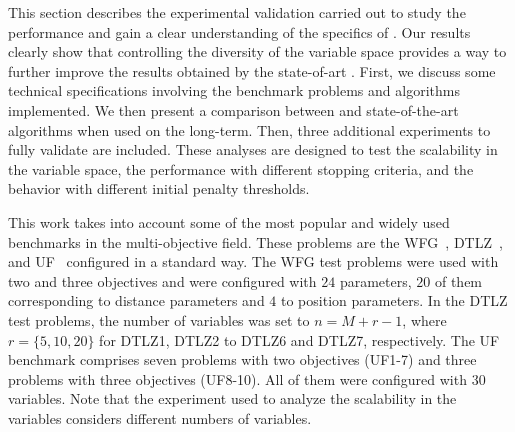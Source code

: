 This section describes the experimental validation carried out to study the performance and
gain a clear understanding of the specifics of \VSDMOEA{}.
%
Our results clearly show that controlling the diversity of the variable space provides a way to further improve the results 
obtained by the state-of-art \MOEAS{}.
%
First, we discuss some technical specifications involving the benchmark problems and algorithms implemented.
%
We then present a comparison between \VSDMOEA{} and state-of-the-art algorithms when used on the long-term.
%
Then, three additional experiments to fully validate \VSDMOEA{} are included.
%
These analyses are designed to test the scalability in the variable space, the performance with different stopping criteria, 
and the behavior with different initial penalty thresholds.

This work takes into account some of the most popular and widely used benchmarks in the multi-objective field.
%
These problems are the WFG~\cite{Joel:WFG}, DTLZ~\cite{Joel:DTLZ}, and UF~\cite{Joel:CEC2009} configured in a 
standard way.
%
The WFG test problems were used with two and three objectives and 
were configured with $24$ parameters, $20$ of them corresponding to distance parameters and $4$ to position parameters.
%
In the DTLZ test problems, the number of variables was set to $n=M+r-1$, where $r=\{5, 10, 20\}$ for DTLZ1, DTLZ2 to DTLZ6 and DTLZ7, respectively.
% 
The UF benchmark comprises seven problems with two objectives (UF1-7) and three problems with three objectives (UF8-10).
%
All of them were configured with $30$ variables.
%
Note that the experiment used to analyze the scalability in the variables considers different numbers of variables.

